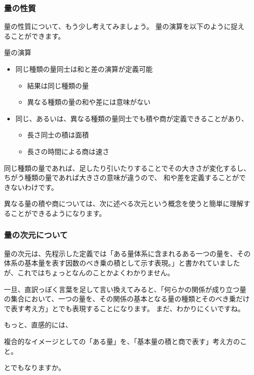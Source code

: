 \documentclass[uplatex,dvipdfmx,a4paper,11pt]{jsreport}
\begin{document}
\subsubsection{量の性質}

量の性質について、もう少し考えてみましょう。
量の演算を以下のように捉えることができます。
\large
	\begin{itembox}[l]{量の演算}
		\begin{itemize}
			\item 同じ種類の量同士は和と差の演算が定義可能
			\begin{itemize}
				\item 結果は同じ種類の量
				\item 異なる種類の量の和や差には意味がない
			\end{itemize}
			\item 同じ、あるいは、異なる種類の量同士でも積や商が定義できることがあり、
			\begin{itemize}
				\item 長さ同士の積は面積
				\item 長さの時間による商は速さ
			\end{itemize}
		\end{itemize}
	\end{itembox}
\normalsize

同じ種類の量であれば、足したり引いたりすることでその大きさが変化するし、ちがう種類の量であれば大きさの意味が違うので、
和や差を定義することができないわけです。

異なる量の積や商については、次に述べる次元という概念を使うと簡単に理解することができるようになります。

\subsubsection{量の次元について}

量の次元は、先程示した定義では「ある量体系に含まれるある一つの量を、その体系の基本量を表す因数のべき乗の積として示す表現。」と書かれていましたが、これではちょっとなんのことかよくわかりません。

一旦、直訳っぽく言葉を足して言い換えてみると、「何らかの関係が成り立つ量の集合において、一つの量を、その関係の基本となる量の種類とそのべき乗だけで表す考え方」とでも表現することになります。
まだ、わかりにくいですね。

もっと、直感的には、
\begin{shadebox}
	\large
	複合的なイメージとしての「ある量」を、「基本量の積と商で表す」考え方のこと。
\end{shadebox}
とでもなりますか。
\end{document}

